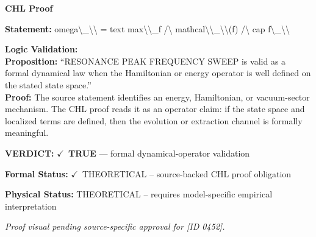 \vspace{0.45em}
\noindent\textbf{CHL Proof}\par
\textbf{Statement:} omega\textbackslash{}\_\textbackslash{}\textbackslash{} = text max\textbackslash{}\textbackslash{}\_f /\textbackslash{} mathcal\textbackslash{}\textbackslash{}\_\textbackslash{}\textbackslash{}(f) /\textbackslash{} cap f\textbackslash{}\_\textbackslash{}\textbackslash{}

\textbf{Logic Validation:}\\
\textbf{Proposition:} ``RESONANCE PEAK FREQUENCY SWEEP is valid as a formal dynamical law when the Hamiltonian
or energy operator is well defined on the stated state space.''\\
\textbf{Proof:} The source statement identifies an energy, Hamiltonian, or vacuum-sector mechanism. The
CHL proof reads it as an operator claim: if the state space and localized terms are
defined, then the evolution or extraction channel is formally meaningful.

\textbf{VERDICT:} \ensuremath{\checkmark}\ \textbf{TRUE} --- formal dynamical-operator validation

\textbf{Formal Status:} \ensuremath{\checkmark}\ THEORETICAL -- source-backed CHL proof obligation

\textbf{Physical Status:} THEORETICAL -- requires model-specific empirical interpretation
\par\vspace{0.45em}
\par
\vfill
\begingroup\footnotesize\itshape
Proof visual pending source-specific approval for [ID 0452].
\par\endgroup
\vfill
\endgroup
\endgroup
